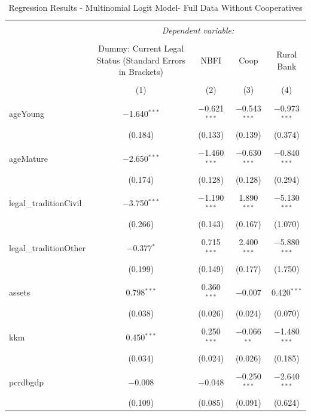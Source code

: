 \documentclass[a4paper,nobind]{templates/ociamthesis}
\begin{document}
\begin{table}[!htbp] \centering 
  \caption{Regression Results - Multinomial Logit Model- Full Data Without Cooperatives} 
  \label{} 
\footnotesize 
\begin{tabular}{@{\extracolsep{5pt}}lcccc} 
\\[-1.8ex]\hline 
\hline \\[-1.8ex] 
 & \multicolumn{4}{c}{\textit{Dependent variable:}} \\ 
\cline{2-5} 
\\[-1.8ex] & Dummy: Current Legal Status (Standard Errors in Brackets) & NBFI & Coop & Rural Bank \\ 
\\[-1.8ex] & (1) & (2) & (3) & (4)\\ 
\hline \\[-1.8ex] 
 ageYoung & $-$1.640$^{***}$ & $-$0.621$^{***}$ & $-$0.543$^{***}$ & $-$0.973$^{***}$ \\ 
  & (0.184) & (0.133) & (0.139) & (0.374) \\ 
  & & & & \\ 
 ageMature & $-$2.650$^{***}$ & $-$1.460$^{***}$ & $-$0.630$^{***}$ & $-$0.840$^{***}$ \\ 
  & (0.174) & (0.128) & (0.128) & (0.294) \\ 
  & & & & \\ 
 legal\_traditionCivil & $-$3.750$^{***}$ & $-$1.190$^{***}$ & 1.890$^{***}$ & $-$5.130$^{***}$ \\ 
  & (0.266) & (0.143) & (0.167) & (1.070) \\ 
  & & & & \\ 
 legal\_traditionOther & $-$0.377$^{*}$ & 0.715$^{***}$ & 2.400$^{***}$ & $-$5.880$^{***}$ \\ 
  & (0.199) & (0.149) & (0.177) & (1.750) \\ 
  & & & & \\ 
 assets & 0.798$^{***}$ & 0.360$^{***}$ & $-$0.007 & 0.420$^{***}$ \\ 
  & (0.038) & (0.026) & (0.024) & (0.070) \\ 
  & & & & \\ 
 kkm & 0.450$^{***}$ & 0.250$^{***}$ & $-$0.066$^{**}$ & $-$1.480$^{***}$ \\ 
  & (0.034) & (0.024) & (0.026) & (0.185) \\ 
  & & & & \\ 
 pcrdbgdp & $-$0.008 & $-$0.048 & $-$0.250$^{***}$ & $-$2.640$^{***}$ \\ 
  & (0.109) & (0.085) & (0.091) & (0.624) \\ 

\end{tabular}
\end{table}
\end{document}
